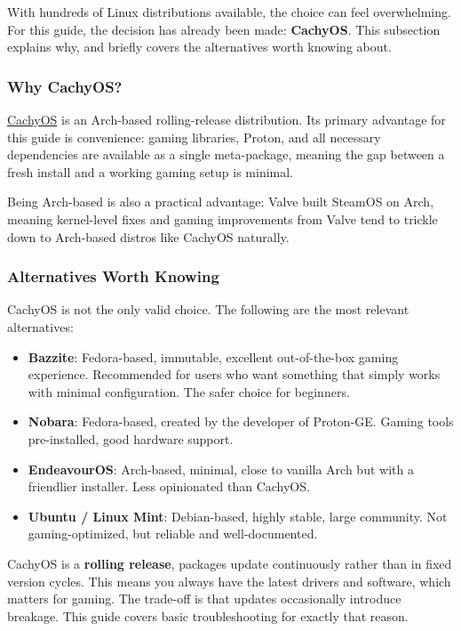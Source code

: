 \documentclass{article}
\begin{document}
With hundreds of Linux distributions available, the choice can feel overwhelming. For
this guide, the decision has already been made: \textbf{CachyOS}. This subsection
explains why, and briefly covers the alternatives worth knowing about.

\subsubsection{Why CachyOS?}

\href{https://cachyos.org}{CachyOS} is an Arch-based rolling-release distribution. Its primary advantage for this guide is convenience: gaming libraries, Proton, and
all necessary dependencies are available as a single meta-package, meaning the gap between a fresh install and a working gaming setup is minimal.

Being Arch-based is also a practical advantage: Valve built SteamOS on Arch, meaning kernel-level fixes and gaming improvements from Valve tend to trickle down to
Arch-based distros like CachyOS naturally.

\subsubsection{Alternatives Worth Knowing}

CachyOS is not the only valid choice. The following are the most relevant alternatives:

\begin{itemize}[leftmargin=1.5em, label={\tiny\textbullet}, nosep]
  \item \textbf{Bazzite}: Fedora-based, immutable, excellent out-of-the-box gaming
    experience. Recommended for users who want something that simply works with minimal
    configuration. The safer choice for beginners.
  \item \textbf{Nobara}: Fedora-based, created by the developer of Proton-GE.
    Gaming tools pre-installed, good hardware support.
  \item \textbf{EndeavourOS}: Arch-based, minimal, close to vanilla Arch but with
    a friendlier installer. Less opinionated than CachyOS.
  \item \textbf{Ubuntu / Linux Mint}: Debian-based, highly stable, large community. Not gaming-optimized, but reliable and well-documented.
\end{itemize}

\begin{tcolorbox}[arc=12pt, outer arc=10pt,
  colback=blue!4!white, colframe=blue!40!black,
  title=\textbf{Rolling Release vs.\ Stable Release}]
  CachyOS is a \textbf{rolling release}, packages update continuously rather than
  in fixed version cycles. This means you always have the latest drivers and software,
  which matters for gaming. The trade-off is that updates occasionally introduce
  breakage. This guide covers basic troubleshooting for exactly that reason.
\end{tcolorbox}
\end{document}
